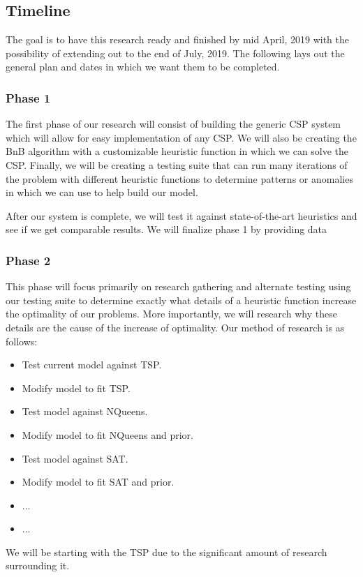 \documentclass[10pt,twoside]{IEEEtran}
\begin{document}
\subsection{Timeline}
The goal is to have this research ready and finished by mid April, 2019 with the possibility of extending out to the end of July, 2019. The following lays out the general plan and dates in which we want them to be completed.
\subsubsection{Phase 1}
The first phase of our research will consist of building the generic CSP system which will allow for easy implementation of any CSP. We will also be creating the BnB algorithm with a customizable heuristic function in which we can solve the CSP. Finally, we will be creating a testing suite that can run many iterations of the problem with different heuristic functions to determine patterns or anomalies in which we can use to help build our model.

After our system is complete, we will test it against state-of-the-art heuristics and see if we get comparable results. We will finalize phase 1 by providing data

\subsubsection{Phase 2}
This phase will focus primarily on research gathering and alternate testing using our testing suite to determine exactly what details of a heuristic function increase the optimality of our problems. More importantly, we will research why these details are the cause of the increase of optimality. Our method of research is as follows:
\begin{itemize}
	\item Test current model against TSP.
	\item Modify model to fit TSP.
	\item Test model against NQueens.
	\item Modify model to fit NQueens and prior.
	\item Test model against SAT.
	\item Modify model to fit SAT and prior.
	\item ...
	\item ...
\end{itemize}

We will be starting with the TSP due to the significant amount of research surrounding it.
\end{document}
